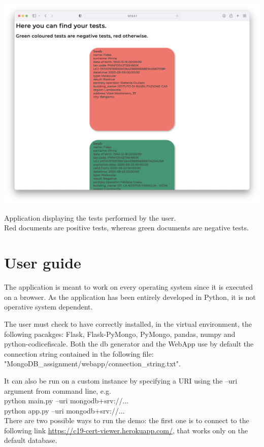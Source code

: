\documentclass{article}
\begin{document}
\begin{center}
\includegraphics[scale=0.23]{tests.png}
    \caption{Application displaying the tests performed by the user. \\Red documents are positive tests, whereas green documents are negative tests.}\end{center}


\newpage

\section{User guide}
The application is meant to work on every operating system since it is executed on a browser. As the application has been entirely developed in Python, it is not operative system dependent.

The user must check to have correctly installed, in the virtual environment, the following pacakges: {\selectfont Flask, Flask-PyMongo, PyMongo, pandas, numpy and python-codicefiscale}.
\hfill\break
Both the db generator and the WebApp use by default the connection string contained in the following file: \\ 
{\selectfont"MongoDB\_assignment/webapp/connection\_string.txt"}.

It can also be run on a custom instance by specifying a URI using the --uri argument from command line, e.g.\\
{\selectfont python main.py --uri mongodb+srv://...}\\
{\selectfont python app.py --uri mongodb+srv://...}
\hfill\break
\\
There are two possible ways to run the demo: the first one is to connect to the following link \url{https://c19-cert-viewer.herokuapp.com/}, that works only on the default database.
\end{document}

